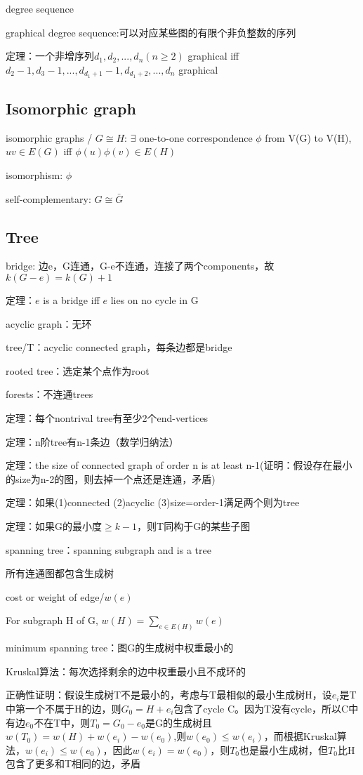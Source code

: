 \documentclass[cn,hazy,blue,screen,14pt]{note}
\begin{document}
degree sequence

graphical degree sequence:可以对应某些图的有限个非负整数的序列

定理：一个非增序列$d_{1},d_{2},...,d_{n}(n\geq 2)$ graphical iff $d_{2}-1,d_{3}-1,...,d_{d_{1}+1}-1,d_{d_{1}+2},...,d_{n}$ graphical

\subsection{Isomorphic graph}
isomorphic graphs / $G\cong H$: $\exists$ one-to-one correspondence $\phi$ from V(G) to V(H), $uv \in E(G)$ iff $\phi(u)\phi(v) \in E(H)$ 

isomorphism: $\phi$

self-complementary: $G\cong \bar{G}$

\subsection{Tree}
bridge: 边e，G连通，G-e不连通，连接了两个components，故$k(G-e)=k(G)+1$

定理：$e$ is a bridge iff $e$ lies on no cycle in G

acyclic graph：无环

tree/T：acyclic connected graph，每条边都是bridge

rooted tree：选定某个点作为root

forests：不连通trees

定理：每个nontrival tree有至少2个end-vertices

定理：n阶tree有n-1条边（数学归纳法）

定理：the size of connected graph of order n is at least n-1(证明：假设存在最小的size为n-2的图，则去掉一个点还是连通，矛盾)

定理：如果(1)connected (2)acyclic (3)size=order-1满足两个则为tree

定理：如果G的最小度$\geq k-1$，则T同构于G的某些子图

spanning tree：spanning subgraph and is a tree

所有连通图都包含生成树

cost or weight of edge/$w(e)$

For subgraph H of G, $w(H)=\sum_{e\in E(H)}w(e)$

minimum spanning tree：图G的生成树中权重最小的

Kruskal算法：每次选择剩余的边中权重最小且不成环的

正确性证明：假设生成树T不是最小的，考虑与T最相似的最小生成树H，设$e_{i}$是T中第一个不属于H的边，则$G_{0}=H+e_{i}$包含了cycle C。因为T没有cycle，所以C中有边$e_{0}$不在T中，则$T_{0}=G_{0}-e_{0}$是G的生成树且$w(T_{0})=w(H)+w(e_{i})-w(e_{0})$,则$w(e_{0})\leq w(e_{i})$，而根据Kruskal算法，$w(e_{i})\leq w(e_{0})$，因此$w(e_{i})=w(e_{0})$，则$T_{0}$也是最小生成树，但$T_{0}$比H包含了更多和T相同的边，矛盾
\end{document}
